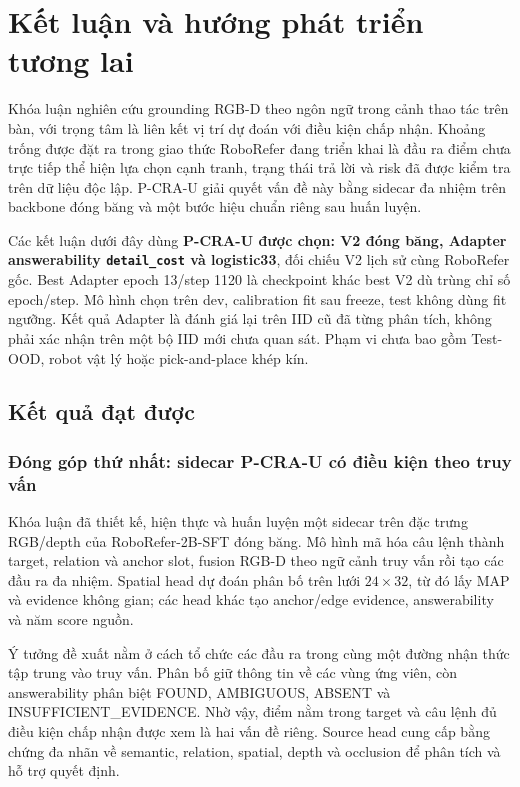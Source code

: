 \chapter{Kết luận và hướng phát triển tương lai}
\label{sec:conclusion}

Khóa luận nghiên cứu grounding RGB-D theo ngôn ngữ trong cảnh thao tác
trên bàn, với trọng tâm là liên kết vị trí dự đoán với điều kiện chấp nhận.
Khoảng trống được đặt ra trong giao thức RoboRefer đang triển khai là
đầu ra điểm chưa trực tiếp thể hiện lựa chọn cạnh tranh, trạng thái trả lời
và risk đã được kiểm tra trên dữ liệu độc lập. P-CRA-U giải quyết vấn đề
này bằng sidecar đa nhiệm trên backbone đóng băng và một bước hiệu chuẩn
riêng sau huấn luyện.

Các kết luận dưới đây dùng \textbf{P-CRA-U được chọn: V2 đóng băng,
Adapter answerability \texttt{detail\_\allowbreak cost} và logistic33}, đối chiếu
V2 lịch sử cùng RoboRefer gốc. Best Adapter epoch 13/step 1120 là
checkpoint khác best V2 dù trùng chỉ số epoch/step. Mô hình chọn trên
dev, calibration fit sau freeze, test không dùng fit ngưỡng.
Kết quả Adapter là đánh giá lại trên IID cũ đã từng phân tích,
không phải xác nhận trên một bộ IID mới chưa quan sát.
Phạm vi chưa bao gồm Test-OOD, robot vật lý hoặc pick-and-place khép kín.

\section{Kết quả đạt được}
\label{sec:conclusion-achievements}

\subsection{Đóng góp thứ nhất: sidecar P-CRA-U có điều kiện theo truy vấn}

Khóa luận đã thiết kế, hiện thực và huấn luyện một sidecar trên đặc
trưng RGB/depth của RoboRefer-2B-SFT đóng băng. Mô hình mã hóa câu lệnh
thành target, relation và anchor slot, fusion RGB-D theo ngữ cảnh
truy vấn rồi tạo các đầu ra đa nhiệm. Spatial head dự đoán phân bố
trên lưới $24\times32$, từ đó lấy MAP và evidence không gian;
các head khác tạo anchor/edge evidence, answerability và năm score nguồn.

Ý tưởng đề xuất nằm ở cách tổ chức các đầu ra trong cùng một đường
nhận thức tập trung vào truy vấn. Phân bố giữ thông tin về các vùng
ứng viên, còn answerability phân biệt FOUND, AMBIGUOUS, ABSENT và
INSUFFICIENT\_EVIDENCE. Nhờ vậy, điểm nằm trong target và câu lệnh
đủ điều kiện chấp nhận được xem là hai vấn đề riêng. Source head
cung cấp bằng chứng đa nhãn về semantic, relation, spatial, depth
và occlusion để phân tích và hỗ trợ quyết định.

